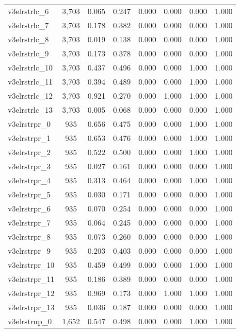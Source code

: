 \begin{table}[!htbp]
\begin{tabular}{@{\extracolsep{5pt}}lccccccc}
v3elrstrlc\_6 & 3,703 & 0.065 & 0.247 & 0.000 & 0.000 & 0.000 & 1.000 \\ 
v3elrstrlc\_7 & 3,703 & 0.178 & 0.382 & 0.000 & 0.000 & 0.000 & 1.000 \\ 
v3elrstrlc\_8 & 3,703 & 0.019 & 0.138 & 0.000 & 0.000 & 0.000 & 1.000 \\ 
v3elrstrlc\_9 & 3,703 & 0.173 & 0.378 & 0.000 & 0.000 & 0.000 & 1.000 \\ 
v3elrstrlc\_10 & 3,703 & 0.437 & 0.496 & 0.000 & 0.000 & 1.000 & 1.000 \\ 
v3elrstrlc\_11 & 3,703 & 0.394 & 0.489 & 0.000 & 0.000 & 1.000 & 1.000 \\ 
v3elrstrlc\_12 & 3,703 & 0.921 & 0.270 & 0.000 & 1.000 & 1.000 & 1.000 \\ 
v3elrstrlc\_13 & 3,703 & 0.005 & 0.068 & 0.000 & 0.000 & 0.000 & 1.000 \\ 
v3elrstrpr\_0 & 935 & 0.656 & 0.475 & 0.000 & 0.000 & 1.000 & 1.000 \\ 
v3elrstrpr\_1 & 935 & 0.653 & 0.476 & 0.000 & 0.000 & 1.000 & 1.000 \\ 
v3elrstrpr\_2 & 935 & 0.522 & 0.500 & 0.000 & 0.000 & 1.000 & 1.000 \\ 
v3elrstrpr\_3 & 935 & 0.027 & 0.161 & 0.000 & 0.000 & 0.000 & 1.000 \\ 
v3elrstrpr\_4 & 935 & 0.313 & 0.464 & 0.000 & 0.000 & 1.000 & 1.000 \\ 
v3elrstrpr\_5 & 935 & 0.030 & 0.171 & 0.000 & 0.000 & 0.000 & 1.000 \\ 
v3elrstrpr\_6 & 935 & 0.070 & 0.254 & 0.000 & 0.000 & 0.000 & 1.000 \\ 
v3elrstrpr\_7 & 935 & 0.064 & 0.245 & 0.000 & 0.000 & 0.000 & 1.000 \\ 
v3elrstrpr\_8 & 935 & 0.073 & 0.260 & 0.000 & 0.000 & 0.000 & 1.000 \\ 
v3elrstrpr\_9 & 935 & 0.203 & 0.403 & 0.000 & 0.000 & 0.000 & 1.000 \\ 
v3elrstrpr\_10 & 935 & 0.459 & 0.499 & 0.000 & 0.000 & 1.000 & 1.000 \\ 
v3elrstrpr\_11 & 935 & 0.186 & 0.389 & 0.000 & 0.000 & 0.000 & 1.000 \\ 
v3elrstrpr\_12 & 935 & 0.969 & 0.173 & 0.000 & 1.000 & 1.000 & 1.000 \\ 
v3elrstrpr\_13 & 935 & 0.036 & 0.187 & 0.000 & 0.000 & 0.000 & 1.000 \\ 
v3elrstrup\_0 & 1,652 & 0.547 & 0.498 & 0.000 & 0.000 & 1.000 & 1.000 \\ 

\end{tabular}
\end{table}
